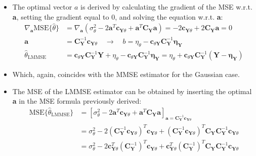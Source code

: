 \begin{itemize}
\begin{align*}
&= \sigma_{\theta}^2 - \mathbf{a}^{T}\mathbf{c}_{\mathbf{Y}\theta} - \mathbf{c}_{\theta\mathbf{Y}}\mathbf{a} + \mathbf{a}^{T}\mathbf{C}_{\mathbf{Y}}\mathbf{a} \\[8pt]
&= \sigma_{\theta}^2 - 2\mathbf{a}^{T}\mathbf{c}_{\mathbf{Y}\theta} + \mathbf{a}^{T}\mathbf{C}_{\mathbf{Y}}\mathbf{a}
\end{align*}
\item The optimal vector \(a\) is derived by calculating the gradient of the MSE w.r.t. \textbf{a}, setting the gradient equal to 0, and solving the equation w.r.t. \textbf{a}:
\begin{align*}
\nabla_{\mathbf{a}}\text{MSE}\{\hat{\theta}\} &= \nabla_{\mathbf{a}}(\sigma_{\theta}^2 - 2\mathbf{a}^{T}\mathbf{c}_{\mathbf{Y}\theta} + \mathbf{a}^{T}\mathbf{C}_{\mathbf{Y}}\mathbf{a}) = -2\mathbf{c}_{\mathbf{Y}\theta} + 2\mathbf{C}_{\mathbf{Y}}\mathbf{a} = 0 \\[8pt]
\mathbf{a} &= \mathbf{C}_{\mathbf{Y}}^{-1}\mathbf{c}_{\mathbf{Y}\theta} \quad \rightarrow \quad b = \eta_{\theta} - \mathbf{c}_{\theta\mathbf{Y}}\mathbf{C}_{\mathbf{Y}}^{-1}\boldsymbol{\eta}_{\mathbf{Y}} \\[8pt]
\hat{\theta}_{\text{LMMSE}} &= \mathbf{c}_{\theta\mathbf{Y}}\mathbf{C}_{\mathbf{Y}}^{-1}\mathbf{Y} + \eta_{\theta} - \mathbf{c}_{\theta\mathbf{Y}}\mathbf{C}_{\mathbf{Y}}^{-1}\boldsymbol{\eta}_{\mathbf{Y}} = \eta_{\theta} + \mathbf{c}_{\theta\mathbf{Y}}\mathbf{C}_{\mathbf{Y}}^{-1}(\mathbf{Y} - \boldsymbol{\eta}_{\mathbf{Y}})
\end{align*}
\item Which, again, coincides with the MMSE estimator for the Gaussian case.
\item The MSE of the LMMSE estimator can be obtained by inserting the optimal \textbf{a} in the MSE formula previously derived:
\begin{align*}
\text{MSE}\{\hat{\theta}_{\text{LMMSE}}\} &= \left[\sigma_{\theta}^2 - 2\mathbf{a}^{T}\mathbf{c}_{\mathbf{Y}\theta} + \mathbf{a}^{T}\mathbf{C}_{\mathbf{Y}}\mathbf{a}\right]_{\mathbf{a}=\mathbf{C}_{\mathbf{Y}}^{-1}\mathbf{c}_{\mathbf{Y}\theta}} \\[8pt]
&= \sigma_{\theta}^2 - 2\left(\mathbf{C}_{\mathbf{Y}}^{-1}\mathbf{c}_{\mathbf{Y}\theta}\right)^{T}\mathbf{c}_{\mathbf{Y}\theta} + \left(\mathbf{C}_{\mathbf{Y}}^{-1}\mathbf{c}_{\mathbf{Y}\theta}\right)^{T}\mathbf{C}_{\mathbf{Y}}\mathbf{C}_{\mathbf{Y}}^{-1}\mathbf{c}_{\mathbf{Y}\theta} \\[8pt]
&= \sigma_{\theta}^2 - 2\mathbf{c}_{\mathbf{Y}\theta}^{T}\left(\mathbf{C}_{\mathbf{Y}}^{-1}\right)^{T}\mathbf{c}_{\mathbf{Y}\theta} + \mathbf{c}_{\mathbf{Y}\theta}^{T}\left(\mathbf{C}_{\mathbf{Y}}^{-1}\right)^{T}\mathbf{C}_{\mathbf{Y}}\mathbf{C}_{\mathbf{Y}}^{-1}\mathbf{c}_{\mathbf{Y}\theta} \\[8pt]

\end{align*}
\end{itemize}
